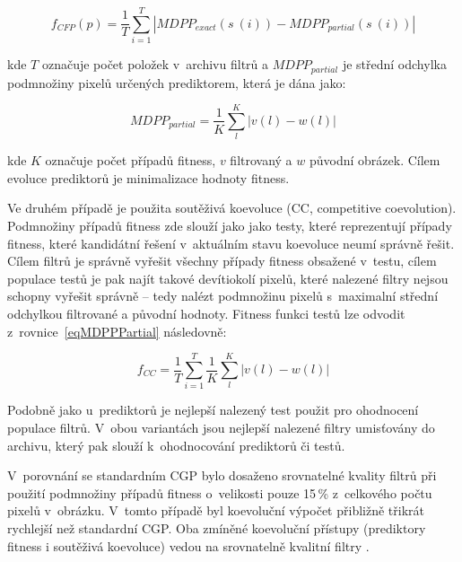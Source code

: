 \begin{equation}
    \label{eqFpredictorIF}
    f_{\mathit{CFP}} \left( p \right) = \frac{1}{T} \sum\limits_{i=1}^{T} \left| \mathit{MDPP_{exact}} \left( s~\left( i \right) \right) - \mathit{MDPP_{partial}} \left( s~\left( i \right) \right) \right|
\end{equation}

\noindent{}kde $T$ označuje počet položek v~archivu filtrů a $\mathit{MDPP_{partial}}$ je střední odchylka podmnožiny pixelů určených prediktorem, která je dána jako:

\begin{equation}
    \label{eqMDPPPartial}
    \mathit{MDPP_{partial}} = \frac{1}{K} \sum\limits_l^K \left| v\left( l \right) - w\left( l \right) \right|
\end{equation}

\noindent{}kde $K$ označuje počet případů fitness, $v$ filtrovaný a $w$ původní obrázek. Cílem evoluce prediktorů je minimalizace hodnoty fitness.

Ve druhém případě je použita soutěživá koevoluce (CC, competitive coevolution). Podmnožiny případů fitness zde slouží jako jako testy, které reprezentují případy fitness, které kandidátní řešení v~aktuálním stavu koevoluce neumí správně řešit. Cílem filtrů je správně vyřešit všechny případy fitness obsažené v~testu, cílem populace testů je pak najít takové devítiokolí pixelů, které nalezené filtry nejsou schopny vyřešit správně -- tedy nalézt podmnožinu pixelů s~maximalní střední odchylkou filtrované a původní hodnoty. Fitness funkci testů lze odvodit z~rovnice~\ref{eqMDPPPartial} následovně:

\begin{equation}
    \label{eqFtestsIF}
    f_{\mathit{CC}} = \frac{1}{T} \sum\limits_{i=1}^{T} \frac{1}{K} \sum\limits_l^K \left| v\left( l \right) - w\left( l \right) \right|
\end{equation}

Podobně jako u~prediktorů je nejlepší nalezený test použit pro ohodnocení populace filtrů. V~obou variantách jsou nejlepší nalezené filtry umisťovány do archivu, který pak slouží k~ohodnocování prediktorů či testů.

V~porovnání se standardním CGP bylo dosaženo srovnatelné kvality filtrů při použití podmnožiny případů fitness o~velikosti pouze 15\,\% z~celkového počtu pixelů v~obrázku. V~tomto případě byl koevoluční výpočet přibližně třikrát rychlejší než standardní CGP. Oba zmíněné koevoluční přístupy (prediktory fitness i soutěživá koevoluce) vedou na srovnatelně kvalitní filtry \cite{SikuPPSN}.

